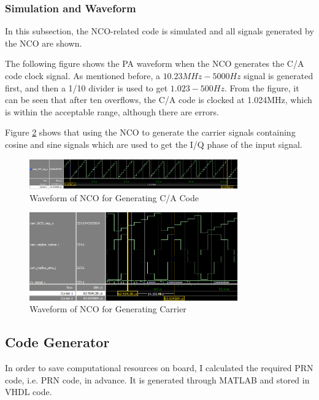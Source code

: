 \subsubsection{Simulation and Waveform}
In this subsection, the NCO-related code is simulated and all signals generated by the NCO are shown.

The following figure shows the PA waveform when the NCO generates the C/A code clock signal. As mentioned before, a $10.23MHz-\num{5000}Hz$ signal is generated first, and then a 1/10 divider is used to get $1.023-500Hz$. From the figure, it can be seen that after ten overflows, the C/A code is clocked at 1.024MHz, which is within the acceptable range, although there are errors.

Figure \ref{fig:nco_carrier_wave} shows that using the NCO to generate the carrier signals containing cosine and sine signals which are used to get the I/Q phase of the input signal.

\begin{figure}[!htbp]
    \centering
    \includegraphics[width=0.8\textwidth]{_IMAGES/nco_code_wave.png}
    \caption{Waveform of NCO for Generating C/A Code}
    \label{fig:nco_code_wave}
\end{figure}

\begin{figure}[!htbp]
    \centering
    \includegraphics[width=0.8\textwidth]{_IMAGES/nco_carrier_wave.png}
    \caption{Waveform of NCO for Generating Carrier}
    \label{fig:nco_carrier_wave}
\end{figure}

\subsection{Code Generator}
In order to save computational resources on board, I calculated the required PRN code, i.e. PRN  code, in advance. It is generated through MATLAB and stored in VHDL code.


